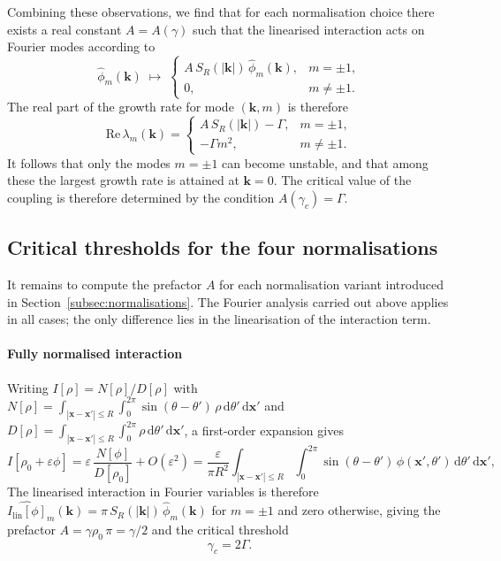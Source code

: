 \documentclass[a4paper,11pt]{article}
\theoremstyle{plain}
\theoremstyle{definition}
\theoremstyle{remark}
\newcommand{\dd}{\,\mathrm{d}}
\newcommand{\bx}{\mathbf{x}}
\newcommand{\bk}{\mathbf{k}}
\begin{document}
Combining these observations, we find that for each normalisation choice there exists a real constant $A = A(\gamma)$ such that the linearised interaction acts on Fourier modes according to
\[
    \hat\phi_m(\bk) \;\longmapsto\;
    \begin{cases}
        A\, S_R(|\bk|)\, \hat\phi_m(\bk), & m = \pm 1, \\
        0, & m \neq \pm 1.
    \end{cases}
\]
The real part of the growth rate for mode $(\bk,m)$ is therefore
\begin{equation}\label{eq:growth-rate}
    \mathrm{Re}\,\lambda_m(\bk) =
    \begin{cases}
        A\, S_R(|\bk|) - \Gamma, & m = \pm 1, \\
        -\Gamma m^2, & m \neq \pm 1.
    \end{cases}
\end{equation}
It follows that only the modes $m = \pm 1$ can become unstable, and that among these the largest growth rate is attained at $\bk =0$. The critical value of the coupling is therefore determined by the condition $A(\gamma_c) = \Gamma$.

\subsection{Critical thresholds for the four normalisations}\label{subsec:thresholds}

It remains to compute the prefactor $A$ for each normalisation variant introduced in Section~\ref{subsec:normalisations}. The Fourier analysis carried out above applies in all cases; the only difference lies in the linearisation of the interaction term.

\paragraph{Fully normalised interaction}

Writing $I[\rho] = N[\rho]/D[\rho]$ with $N[\rho] = \int_{|\bx-\bx'|\leq R}\int_0^{2\pi}\sin(\theta-\theta')\,\rho\dd\theta'\dd\bx'$ and $D[\rho] = \int_{|\bx-\bx'|\leq R}\int_0^{2\pi}\rho\dd\theta'\dd\bx'$, a first-order expansion gives
\[
    I[\rho_0 + \varepsilon\phi]
    = \varepsilon\,\frac{N[\phi]}{D[\rho_0]} + O(\varepsilon^2)
    = \frac{\varepsilon}{\pi R^2}\int_{|\bx-\bx'|\leq R}\int_0^{2\pi}
    \sin(\theta-\theta')\,\phi(\bx',\theta')\dd\theta'\dd\bx',
\]
The linearised interaction in Fourier variables is therefore $\widehat{I_{\mathrm{lin}}[\phi]}_m(\bk) = \pi\, S_R(|\bk|)\,\hat\phi_m(\bk)$ for $m = \pm 1$ and zero otherwise, giving the prefactor $A = \gamma\rho_0\,\pi = \gamma/2$ and the critical threshold
\begin{equation*}\label{eq:gc-normalised}
    \gamma_c = 2\Gamma.
\end{equation*}
\end{document}
